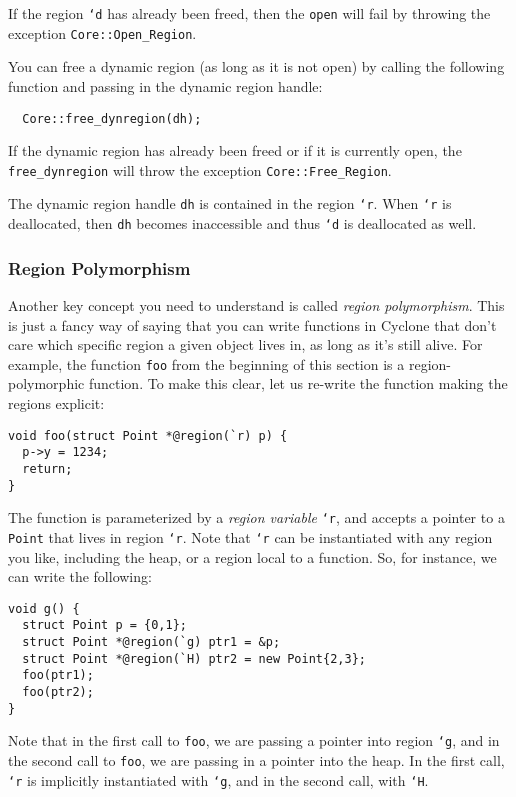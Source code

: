 If the region \texttt{`d} has already been freed, then the 
\texttt{open} will fail by throwing the exception \texttt{Core::Open_Region}.

You can free a dynamic region (as long as it is not open) by 
calling the following function and passing in the dynamic
region handle:
\begin{verbatim}
  Core::free_dynregion(dh);
\end{verbatim}
If the dynamic region has already been freed or if it is currently
open, the \texttt{free_dynregion} will throw the exception
\texttt{Core::Free_Region}.

The dynamic region handle \texttt{dh} is contained in the region
\texttt{`r}.  When \texttt{`r} is deallocated, then \texttt{dh}
becomes inaccessible and thus \texttt{`d} is deallocated as well.  

\subsubsection*{Region Polymorphism}

Another key concept you need to understand is called
\emph{region polymorphism}.  This is just a fancy way of saying
that you can write functions in Cyclone that don't care which
specific region a given object lives in, as long as it's still
alive.  For example, the function \texttt{foo} from the beginning
of this section is a region-polymorphic function.  To make this
clear, let us re-write the function making the regions explicit:
\begin{verbatim}
void foo(struct Point *@region(`r) p) {
  p->y = 1234;
  return;
}
\end{verbatim}
The function is parameterized by a \emph{region variable} \texttt{`r},
and accepts a pointer to a \texttt{Point} that lives in region
\texttt{`r}.  Note that \texttt{`r} can be instantiated with any
region you like, including the heap, or a region local to a function.
So, for instance, we can write the following:
\begin{verbatim}
void g() {
  struct Point p = {0,1};
  struct Point *@region(`g) ptr1 = &p;
  struct Point *@region(`H) ptr2 = new Point{2,3};
  foo(ptr1);
  foo(ptr2);
}
\end{verbatim}
Note that in the first call to \texttt{foo}, we are passing
a pointer into region \texttt{`g}, and in the second call to 
\texttt{foo}, we are passing in a pointer into the heap.  In
the first call, \texttt{`r} is implicitly instantiated with
\texttt{`g}, and in the second call, with \texttt{`H}.  

